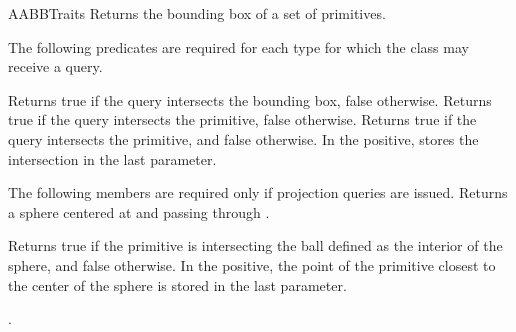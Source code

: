 \begin{ccRefConcept}{AABBTraits}
{Returns the bounding box of a set of primitives.}

The following predicates are required for each type 
for which the class  may receive a query.

{Returns true if the query intersects the bounding box, false otherwise.}
\ccGlue	
{}
{Returns true if the query intersects the primitive, false otherwise.}
\ccGlue	
{Returns true if the query intersects the primitive, and false otherwise. In the positive, stores the intersection in the last parameter. }




The following members are required only if projection queries are issued.
{Returns a sphere centered at  and passing through .}

{Returns true if the primitive is intersecting the ball defined as the interior of the sphere, and false otherwise. In the positive, the point of the primitive closest to the center of the sphere is stored in the last parameter.}


\ccHasModels

.


\ccSeeAlso
{}\\



\end{ccRefConcept}
